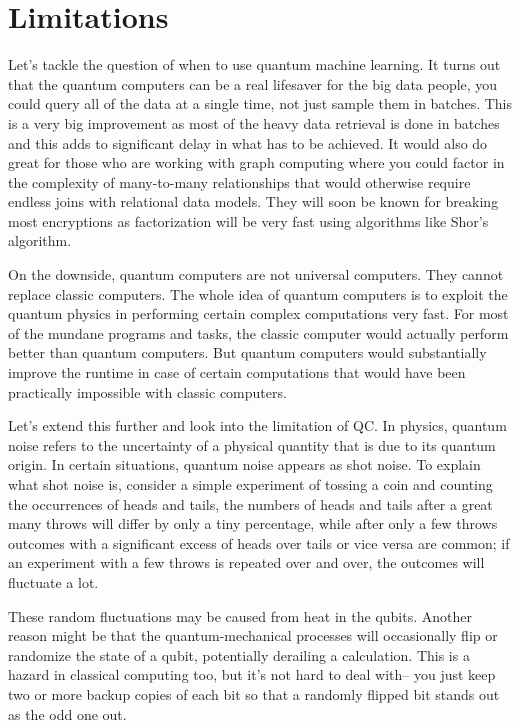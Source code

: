 {\chapter{Limitations}\label{ch:limitations}}
Let's tackle the question of when to use quantum machine learning. It turns out that the quantum computers can be a real lifesaver for the big data people, you could query all of the data at a single time, not just sample them in batches. This is a very big improvement as most of the heavy data retrieval is done in batches and this adds to significant delay in what has to be achieved. It would also do great for those who are working with graph computing where you could factor in the complexity of many-to-many relationships that would otherwise require endless joins with relational data models. They will soon be known for breaking most encryptions as factorization will be very fast using algorithms like Shor's algorithm.\par\bigskip
On the downside, quantum computers are not universal computers. They cannot replace classic computers. The whole idea of quantum computers is to exploit the quantum physics in performing certain complex computations very fast. For most of the mundane programs and tasks, the classic computer would actually perform better than quantum computers. But quantum computers would substantially improve the runtime in case of certain computations that would have been practically impossible with classic computers.\par\bigskip
Let's extend this further and look into the limitation of QC.
In physics, quantum noise refers to the uncertainty of a physical quantity that is due to its quantum origin. In certain situations, quantum noise appears as shot noise. To explain what shot noise is, consider a simple experiment of tossing a coin and counting the occurrences of heads and tails, the numbers of heads and tails after a great many throws will differ by only a tiny percentage, while after only a few throws outcomes with a significant excess of heads over tails or vice versa are common; if an experiment with a few throws is repeated over and over, the outcomes will fluctuate a lot.\par\bigskip
These random fluctuations may be caused from heat in the qubits. Another reason might be that the quantum-mechanical processes will occasionally flip or randomize the state of a qubit, potentially derailing a calculation. This is a hazard in classical computing too, but it's not hard to deal with-- you just keep two or more backup copies of each bit so that a randomly flipped bit stands out as the odd one out. \par\bigskip
